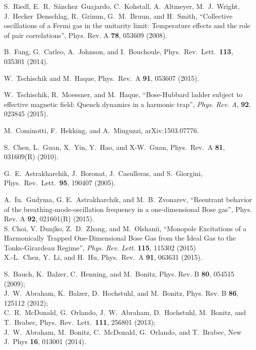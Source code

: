 \documentclass[onecolumn,pra]{revtex4-1}
\begin{document}
\begin{thebibliography}{1}
S.~Riedl, E.~R.~S\'anchez~Guajardo, C.~Kohstall, A.~Altmeyer, M.~J.~Wright, J.~Hecker~Denschlag,
R.~Grimm, G.~M.~Bruun, and H.~Smith, ``Collective oscillations of a Fermi gas in the unitarity
limit: Temperature effects and the role of pair correlations'', Phys. Rev. A {\bf 78}, 053609
(2008).

B.~Fang, G.~Carleo, A.~Johnson, and I.~Bouchoule,  Phys.\ Rev.\ Lett.\ 
\textbf{113}, 035301 (2014).   

 W.~Tschischik and M.~Haque, Phys.\ Rev.~A 
  \textbf{91}, 053607 (2015).

 W.~Tschischik, R.~Moessner, and M.~Haque, ``Bose-Hubbard ladder
  subject to effective magnetic field: Quench dynamics in a harmonic trap'',
{\em Phys. Rev. A},  {\bf 92}, 023845 (2015). 

  
 M.~Cominotti, F.~Hekking, and A.~Minguzzi, 
arXiv:1503.07776.

 S.~Chen, L.~Guan, X.~Yin, Y.~Hao, and X-W.~Guan,   Phys.\ Rev.\ A
  \textbf{81}, 031609(R) (2010). 

 G.~E.~Astrakharchik, J.~Boronat, J.~Casulleras, and
  S.~Giorgini, Phys.\ Rev.\ Lett.\ \textbf{95}, 190407 (2005).

  
A.~Iu.~Gudyma, G. E.~Astrakharchik, and M.~B.~Zvonarev, ``Reentrant behavior of the
breathing-mode-oscillation frequency in a one-dimensional Bose gas'', 
Phys. Rev. A \textbf{92}, 021601(R) (2015). \\ 
%
S. Choi, V. Dunjko, Z.~D.~Zhang, and M.~Olshanii,
``Monopole Excitations of a Harmonically Trapped One-Dimensional Bose Gas from the Ideal Gas to the
Tonks-Girardeau Regime'', 
{\em Phys. Rev. Lett.} \textbf{115}, 115302 (2015)
%
\\
%
X.-L.~Chen, Y.~Li, and H.~Hu,  Phys.\ Rev.\ A \textbf{91}, 063631 (2015).


%
S.~Bauch, K.~Balzer, C.~Henning, and M.~Bonitz, Phys. Rev. B \textbf{80}, 054515 
(2009);
%
\\
%
J.~W.~Abraham, K.~Balzer, D.~Hochstuhl, and M.~Bonitz, Phys. Rev. B \textbf{86}, 
125112 (2012);
%
\\
%
C.~R.~McDonald, G.~Orlando, J.~W.~Abraham, D.~Hochstuhl, M.~Bonitz, and T.~Brabec, Phys.\ Rev.\
Lett.\ \textbf{111}, 256801 (2013);
%
\\
%
J.~W.~Abraham, M.~Bonitz, C.~McDonald, G.~Orlando, and T.~Brabec, New J.~Phys \textbf{16}, 013001
(2014).




\end{thebibliography}
\end{document}
